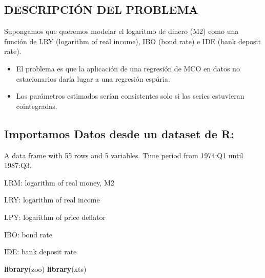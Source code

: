 \documentclass[
]{book}
\newenvironment{Shaded}{\begin{snugshade}}{\end{snugshade}}
\newcommand{\FunctionTok}[1]{\textcolor[rgb]{0.13,0.29,0.53}{\textbf{#1}}}
\newcommand{\NormalTok}[1]{#1}
\begin{document}
\hypertarget{descripciuxf3n-del-problema}{%
\subsection{DESCRIPCIÓN DEL PROBLEMA}\label{descripciuxf3n-del-problema}}

Supongamos que queremos modelar el logaritmo de dinero (M2) como una función de LRY (logarithm of real income), IBO (bond rate) e IDE (bank deposit rate).

\begin{itemize}
\item
  El problema es que la aplicación de una regresión de MCO en datos no estacionarios daría lugar a una regresión espúria.
\item
  Los parámetros estimados serían consistentes solo si las series estuvieran cointegradas.
\end{itemize}

\hypertarget{importamos-datos-desde-un-dataset-de-r}{%
\subsection{Importamos Datos desde un dataset de R:}\label{importamos-datos-desde-un-dataset-de-r}}

A data frame with 55 rows and 5 variables. Time period from 1974:Q1 until 1987:Q3.

LRM: logarithm of real money, M2

LRY: logarithm of real income

LPY: logarithm of price deflator

IBO: bond rate

IDE: bank deposit rate

\begin{Shaded}
\begin{Highlighting}[]
\FunctionTok{library}\NormalTok{(zoo) }
\FunctionTok{library}\NormalTok{(xts) }
\end{Highlighting}
\end{Shaded}
\end{document}
